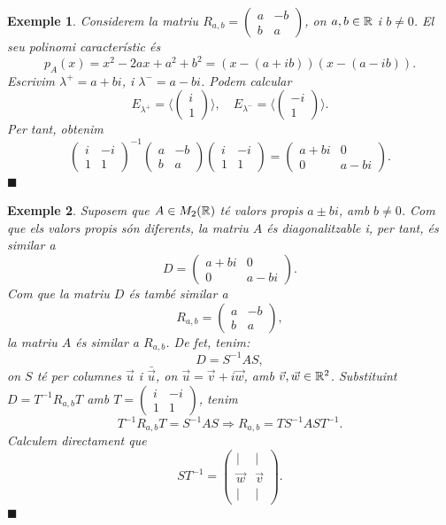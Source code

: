 \documentclass[
  11pt,
]{book}
\numberwithin{dummy}{section}
\theoremstyle{maincolornumbox}
\theoremstyle{blacknumex}
\newtheorem{exampleT}{Exemple}[chapter]
\theoremstyle{blacknumbox}
\theoremstyle{maincolornum}
\newenvironment{example}{\begin{exampleT}}{\hfill{\tiny\ensuremath{\blacksquare}}\end{exampleT}}
\begin{document}
\begin{example}
Considerem la matriu \(R_{a,b}=\begin{pmatrix}a&-b\\b&a\end{pmatrix}\), on
\(a, b\in\mathbb{R}\) i \(b\neq 0\). El seu polinomi característic és
\[p_A(x) = x^2-2ax +a^2+b^2 = (x-(a+ib))(x-(a-ib)).\] Escrivim
\(\lambda^+= a+bi\), i \(\lambda^- = a-bi\). Podem calcular
\[E_{\lambda^+} = \langle \begin{pmatrix}i\\1\end{pmatrix}\rangle, \quad E_{\lambda^-} = \langle \begin{pmatrix}-i\\1\end{pmatrix}\rangle.\]
Per tant, obtenim \[\begin{pmatrix}
i & -i\\1 & 1
\end{pmatrix}^{-1}
\begin{pmatrix}
a&-b\\b&a
\end{pmatrix}
\begin{pmatrix}
i & -i\\1 & 1
\end{pmatrix}
=
\begin{pmatrix}
a+bi&0\\0&a-bi
\end{pmatrix}.\]
\end{example}

\begin{example}
Suposem que \(A\in M_2(\mathbb{R})\) té valors propis \(a\pm bi\), amb \(b\neq 0\).
Com que els valors propis són diferents, la matriu \(A\) és
diagonalitzable i, per tant, és similar a \[D = \begin{pmatrix}
a+bi&0\\0&a-bi
\end{pmatrix}.\] Com que la matriu \(D\) és també similar a
\[R_{a,b} = \begin{pmatrix}
a&-b\\b&a
\end{pmatrix},\] la matriu \(A\) és similar a \(R_{a,b}\). De fet, tenim:
\[D = S^{-1} A S,\] on \(S\) té per columnes \(\vec u\) i \(\bar \vec u\), on
\(\vec u = \vec v  + i \vec w\), amb \(\vec v,\vec w\in \mathbb{R}^2\). Substituint
\(D = T^{-1} R_{a,b} T\) amb \(T = \begin{pmatrix}
i & -i\\1 & 1
\end{pmatrix}\), tenim
\[T^{-1} R_{a,b} T = S^{-1} A S\Longrightarrow R_{a,b} = TS^{-1} A ST^{-1}.\]
Calculem directament que \[ST^{-1} = \begin{pmatrix}
\vert&\vert\\
\vec w&\vec v\\
\vert&\vert
\end{pmatrix}.\]
\end{example}
\end{document}
